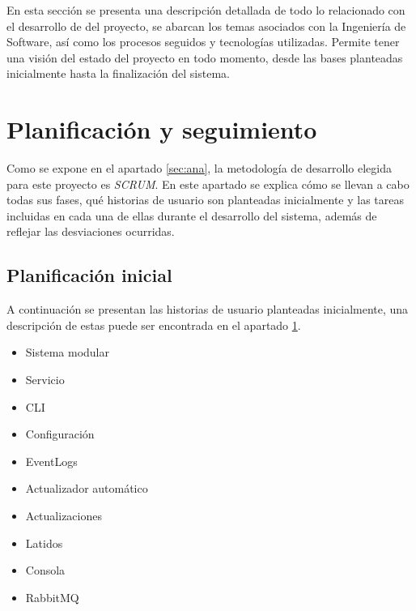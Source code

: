 En esta sección se presenta una descripción detallada de todo lo relacionado con el desarrollo de del proyecto, se abarcan los temas asociados con la Ingeniería de Software, así como los procesos seguidos y tecnologías utilizadas. Permite tener una visión del estado del proyecto en todo momento, desde las bases planteadas inicialmente hasta la finalización del sistema.

\section{Planificación y seguimiento} \label{sec:plan}
    
    Como se expone en el apartado \ref{sec:ana}, la metodología de desarrollo elegida para este proyecto es \textit{SCRUM}.  En este apartado se explica cómo se llevan a cabo todas sus fases, qué historias de usuario son planteadas inicialmente y las tareas incluidas en cada una de ellas durante el desarrollo del sistema, además de reflejar las desviaciones ocurridas.
    
    \subsection{Planificación inicial}
        
        A continuación se presentan las historias de usuario planteadas inicialmente, una descripción de estas puede ser encontrada en el apartado \ref{sec:plan}.
        
        \begin{itemize}
            \item Sistema modular
            \item Servicio
            \item CLI
            \item Configuración
            \item EventLogs
            \item Actualizador automático
            \item Actualizaciones
            \item Latidos
            \item Consola
            \item RabbitMQ
        \end{itemize}
    
